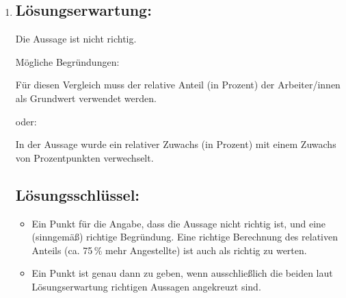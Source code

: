 \begin{langesbeispiel}
{\begin{enumerate}
1. Quartil: 

3. Quartil: \leer

Die Behauptung ist richtig, wie die folgenden Interquartilsabstände zeigen:

Lehrabschluss: 

BMS-Abschluss: 

Abschluss einer höheren Schule: 

Universitätsabschluss: 
	
	\subsection{Lösungsschlüssel:}
	
\begin{itemize}
	\item Ein Ausgleichspunkt für die Angabe beider korrekten Werte.
	\item Ein Punkt für eine (sinngemäß) richtige Begründung. 
\end{itemize}

\item \subsection{Lösungserwartung:}
			
Die Aussage ist nicht richtig.

Mögliche Begründungen:

Für diesen Vergleich muss der relative Anteil (in Prozent) der Arbeiter/innen als Grundwert verwendet werden.

oder:

In der Aussage wurde ein relativer Zuwachs (in Prozent) mit einem Zuwachs von Prozentpunkten verwechselt.
	
	\subsection{Lösungsschlüssel:}
	
\begin{itemize}
	\item Ein Punkt für die Angabe, dass die Aussage nicht richtig ist, und eine (sinngemäß) richtige Begründung. Eine richtige Berechnung des relativen Anteils (ca. 75\,\% mehr Angestellte) ist auch als richtig zu werten. 
	\item Ein Punkt ist genau dann zu geben, wenn ausschließlich die beiden laut Lösungserwartung richtigen Aussagen angekreuzt sind.
\end{itemize}

\end{enumerate}}
		\end{langesbeispiel}